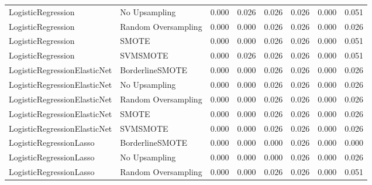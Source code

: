 \begin{tabular}{llllllll}
          LogisticRegression &       No Upsampling & 0.000 &                     0.026 &                 0.026 &                  0.026 &                                   0.000 &     0.051 \\
          LogisticRegression & Random Oversampling & 0.000 &                     0.000 &                 0.026 &                  0.026 &                                   0.000 &     0.026 \\
          LogisticRegression &               SMOTE & 0.000 &                     0.000 &                 0.026 &                  0.026 &                                   0.000 &     0.051 \\
          LogisticRegression &            SVMSMOTE & 0.000 &                     0.026 &                 0.026 &                  0.026 &                                   0.000 &     0.051 \\
LogisticRegressionElasticNet &     BorderlineSMOTE & 0.000 &                     0.000 &                 0.026 &                  0.026 &                                   0.000 &     0.026 \\
LogisticRegressionElasticNet &       No Upsampling & 0.000 &                     0.000 &                 0.026 &                  0.026 &                                   0.000 &     0.026 \\
LogisticRegressionElasticNet & Random Oversampling & 0.000 &                     0.000 &                 0.026 &                  0.026 &                                   0.000 &     0.026 \\
LogisticRegressionElasticNet &               SMOTE & 0.000 &                     0.000 &                 0.026 &                  0.026 &                                   0.000 &     0.026 \\
LogisticRegressionElasticNet &            SVMSMOTE & 0.000 &                     0.000 &                 0.026 &                  0.026 &                                   0.000 &     0.026 \\
     LogisticRegressionLasso &     BorderlineSMOTE & 0.000 &                     0.000 &                 0.000 &                  0.026 &                                   0.000 &     0.000 \\
     LogisticRegressionLasso &       No Upsampling & 0.000 &                     0.000 &                 0.000 &                  0.026 &                                   0.000 &     0.026 \\
     LogisticRegressionLasso & Random Oversampling & 0.000 &                     0.000 &                 0.026 &                  0.026 &                                   0.000 &     0.051 \\

\end{tabular}
